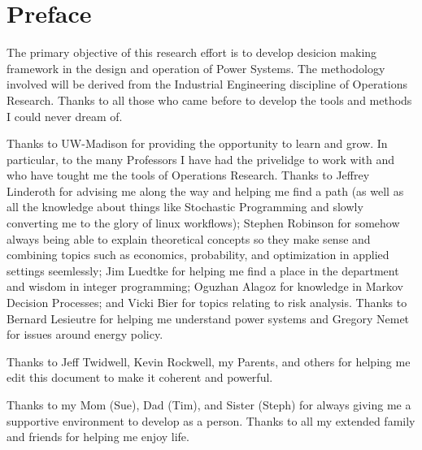 

\chapter*{Preface}\normalsize

The primary objective of this research effort is to develop desicion making framework in the design and operation of Power Systems.  The methodology involved will be derived from the Industrial Engineering discipline of Operations Research.  Thanks to all those who came before to develop the tools and methods I could never dream of.

Thanks to UW-Madison for providing the opportunity to learn and grow.  In particular, to the many Professors I have had the privelidge to work with and who have tought me the tools of Operations Research.   Thanks to Jeffrey Linderoth for advising me along the way and helping me find a path (as well as all the knowledge about things like Stochastic Programming and slowly converting me to the glory of linux workflows); Stephen Robinson for somehow always being able to explain theoretical concepts so they make sense and combining topics such as economics, probability, and optimization in applied settings seemlessly; Jim Luedtke for helping me find a place in the department and wisdom in integer programming; Oguzhan Alagoz for knowledge in Markov Decision Processes; and Vicki Bier for topics relating to risk analysis.  Thanks to Bernard Lesieutre for helping me understand power systems and Gregory Nemet for issues around energy policy.

Thanks to Jeff Twidwell, Kevin Rockwell, my Parents, and others for helping me edit this document to make it coherent and powerful.

Thanks to my Mom (Sue), Dad (Tim), and Sister (Steph) for always giving me a supportive environment to develop as a person.  Thanks to all my extended family and friends for helping me enjoy life.

